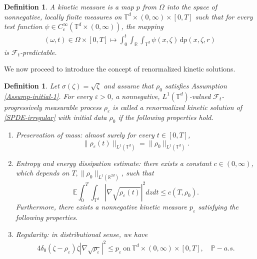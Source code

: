 \documentclass[UTF-8,reqno]{amsart}
\numberwithin{equation}{section}
\newtheorem{definition}[theorem]{Definition}
\def\leq{\leqslant}
\def\leq{\leqslant}
\begin{document}
\begin{definition}\label{def-kineticmeasure}
	 A \emph{kinetic measure} is a map $p$ from $\Omega$ into the space of nonnegative, locally finite measures on $\mathbb{T}^{d}\times(0,\infty)\times[0,T]$ such that for every test function $\psi\in C^{\infty}_c(\mathbb{T}^{d}\times (0,\infty))$, the mapping
	\begin{align*}
	(\omega,t)\in \Omega\times[0,T]\mapsto
	\int^t_0\int_{\mathbb{R}}\int_{\mathbb{T}^{d}}\psi(x,\zeta)\,\mathrm{d}p(x,\zeta,r)
	\end{align*}
	is $\mathcal{F}_t$-predictable.
\end{definition}

We now proceed to introduce the concept of renormalized kinetic solutions. 
\begin{definition}\label{def-kineticsolution} 
Let $\sigma(\zeta)=\sqrt{\zeta}$ and assume that $\rho_0$ satisfies Assumption \ref{Assump-initial-1}. For every $\varepsilon>0$, a nonnegative, $L^1(\mathbb{T}^{d})$-valued $\mathcal{F}_t$-progressively measurable process $\rho_{\varepsilon}$ is called a \emph{renormalized kinetic  solution} of \eqref{SPDE-irregular} with initial data $\rho_0$ if the following properties hold.
\begin{enumerate}
		\item Preservation of mass: almost surely for every $t\in[0,T]$,
		\begin{equation}\label{preservation-mass}
		\|\rho_{\varepsilon}(t)\|_{L^{1}(\mathbb{T}^{d})}=\|\rho_0\|_{L^{1}\left(\mathbb{T}^{d}\right)}.
		\end{equation}
		\item Entropy and energy dissipation estimate: there exists a constant $c\in(0,\infty)$, which depends on $T,\|\rho_0\|_{L^1(\mathbb{R}^{2d})}$, such that
		\begin{equation}\label{L2-es}
			\mathbb{E}\int_{0}^{T}\int_{\mathbb{T}^{d}}|\nabla \sqrt{\rho_{\varepsilon}(t)}|^2dzdt\leq c(T,\rho_0).
		\end{equation}
		Furthermore, there exists a nonnegative kinetic measure $p_{\varepsilon}$ satisfying the following properties.
		\item Regularity: in distributional sense, we have 
		\begin{align}\label{control KM}
		4\delta_{0}(\zeta-\rho_{\varepsilon})\zeta|\nabla \sqrt{\rho_{\varepsilon}}|^{2}\leq p_{\varepsilon}\ \text{on}\ \mathbb{T}^{d}\times(0,\infty)\times[0,T], \quad \mathbb{P}-a.s.
		\end{align}

\end{enumerate}
\end{definition}
\end{document}
